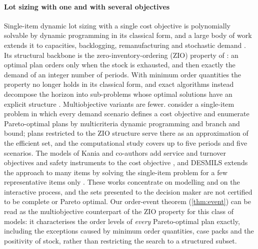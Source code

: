 \documentclass[preprint,12pt,authoryear]{elsarticle}
\begin{document}
\paragraph{Lot sizing with one and with several objectives}
Single-item dynamic lot sizing with a single cost objective is polynomially solvable by
dynamic programming in its classical form, and a large body of work extends it to
capacities, backlogging, remanufacturing and stochastic demand \citep{Brahimi2017}. Its
structural backbone is the zero-inventory-ordering (ZIO) property of
\citet{WagnerWhitin1958}: an optimal plan orders only when the stock is exhausted, and then
exactly the demand of an integer number of periods. With minimum order quantities the
property no longer holds in its classical form, and exact algorithms instead decompose
the horizon into sub-problems whose optimal solutions have an explicit structure
\citep{OkhrinRichter2011EJOR,OkhrinRichter2011IJPE}. Multiobjective variants are fewer.
\citet{Gutierrez2004} consider a single-item problem in which every demand scenario defines
a cost objective and enumerate Pareto-optimal plans by multicriteria dynamic programming
and branch and bound; plans restricted to the ZIO structure serve there as an
approximation of the efficient set, and the computational study covers up to five periods
and five scenarios. The models of Kania and co-authors add service and turnover objectives
and safety instruments to the cost objective \citep{Kania2021ICCL,Kania2022CIE}, and DESMILS
extends the approach to many items by solving the single-item problem for a few
representative items only \citep{Kania2024DESMILS}. These works concentrate on modelling
and on the interactive process, and the sets presented to the decision maker are not
certified to be complete or Pareto optimal. Our order-event theorem (\cref{thm:event}) can
be read as the multiobjective counterpart of the ZIO property for this class of models: it
characterises the order levels of \emph{every} Pareto-optimal plan exactly, including the
exceptions caused by minimum order quantities, case packs and the positivity of stock,
rather than restricting the search to a structured subset.
\end{document}

